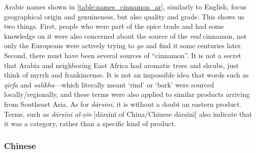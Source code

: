 Arabic names shown in \cref{table:names_cinnamon_ar}, similarly to English, focus geographical origin and genuineness, but also quality and grade. This shows us two things. First, people who were part of the spice trade and had some knowledge  on it were also concerned about the source of the \emph{real} cinnamon, not only the Europeans were actively trying to \emph{go} and find it some centuries later. Second, there must have been several sources of ``cinnamon''. It is not a secret that Arabia and neighboring East Africa had aromatic trees and shrubs, just think of myrrh and frankincense. It is not an impossible idea that words such as \textit{qirfa} and \textit{salīkha}---which literally meant `rind' or `bark' were sourced locally/regionally, and these terms were also applied to similar products arriving from Southeast Asia. As for \textit{dārsīnī}, it is without a doubt an eastern product. Terms, such as \textit{dārṣīnī al-ṣīn} [dārṣīnī of China/Chinese dārṣīnī] also indicate that it was a category, rather than a specific kind of product. 

\setlength{\tabcolsep}{2pt}



\setlength{\tabcolsep}{6pt}

\subsubsection{Chinese}
\label{sec:cinnamon_names_zh}

